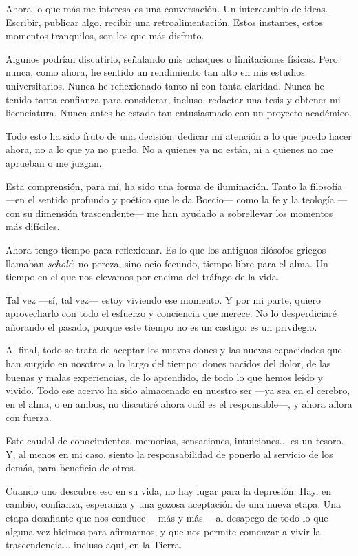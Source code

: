 \documentclass[12pt]{article}
\begin{document}
Ahora lo que más me interesa es una conversación. Un intercambio de ideas. Escribir, publicar algo, recibir una retroalimentación. Estos instantes, estos momentos tranquilos, son los que más disfruto.

Algunos podrían discutirlo, señalando mis achaques o limitaciones físicas. Pero nunca, como ahora, he sentido un rendimiento tan alto en mis estudios universitarios. Nunca he reflexionado tanto ni con tanta claridad. Nunca he tenido tanta confianza para considerar, incluso, redactar una tesis y obtener mi licenciatura. Nunca antes he estado tan entusiasmado con un proyecto académico.

Todo esto ha sido fruto de una decisión: dedicar mi atención a lo que puedo hacer ahora, no a lo que ya no puedo. No a quienes ya no están, ni a quienes no me aprueban o me juzgan.

Esta comprensión, para mí, ha sido una forma de iluminación. Tanto la filosofía —en el sentido profundo y poético que le da Boecio— como la fe y la teología —con su dimensión trascendente— me han ayudado a sobrellevar los momentos más difíciles.

Ahora tengo tiempo para reflexionar. Es lo que los antiguos filósofos griegos llamaban \textit{scholé}: no pereza, sino ocio fecundo, tiempo libre para el alma. Un tiempo en el que nos elevamos por encima del tráfago de la vida.

Tal vez —sí, tal vez— estoy viviendo ese momento. Y por mi parte, quiero aprovecharlo con todo el esfuerzo y conciencia que merece. No lo desperdiciaré añorando el pasado, porque este tiempo no es un castigo: es un privilegio.

Al final, todo se trata de aceptar los nuevos dones y las nuevas capacidades que han surgido en nosotros a lo largo del tiempo: dones nacidos del dolor, de las buenas y malas experiencias, de lo aprendido, de todo lo que hemos leído y vivido. Todo ese acervo ha sido almacenado en nuestro ser —ya sea en el cerebro, en el alma, o en ambos, no discutiré ahora cuál es el responsable—, y ahora aflora con fuerza.

Este caudal de conocimientos, memorias, sensaciones, intuiciones... es un tesoro. Y, al menos en mi caso, siento la responsabilidad de ponerlo al servicio de los demás, para beneficio de otros.

Cuando uno descubre eso en su vida, no hay lugar para la depresión. Hay, en cambio, confianza, esperanza y una gozosa aceptación de una nueva etapa. Una etapa desafiante que nos conduce —más y más— al desapego de todo lo que alguna vez hicimos para afirmarnos, y que nos permite comenzar a vivir la trascendencia... incluso aquí, en la Tierra.
\end{document}
